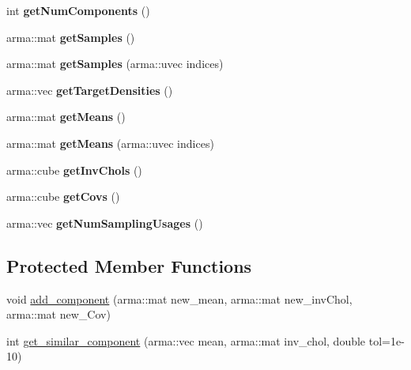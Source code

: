 \begin{DoxyCompactItemize}
\item 
int {\bfseries get\+Num\+Components} ()\hypertarget{classSampleDatabase_ac60d156aee4f7c99a05db259b2a7247f}{}\label{classSampleDatabase_ac60d156aee4f7c99a05db259b2a7247f}

\item 
arma\+::mat {\bfseries get\+Samples} ()\hypertarget{classSampleDatabase_a4aabc7d8ad5d3907b5eda51bc6612a4a}{}\label{classSampleDatabase_a4aabc7d8ad5d3907b5eda51bc6612a4a}

\item 
arma\+::mat {\bfseries get\+Samples} (arma\+::uvec indices)\hypertarget{classSampleDatabase_ab3e52f865350a6d88b16b089b61c3dd9}{}\label{classSampleDatabase_ab3e52f865350a6d88b16b089b61c3dd9}

\item 
arma\+::vec {\bfseries get\+Target\+Densities} ()\hypertarget{classSampleDatabase_a17fe9d9d904446ed71b717166ab452f3}{}\label{classSampleDatabase_a17fe9d9d904446ed71b717166ab452f3}

\item 
arma\+::mat {\bfseries get\+Means} ()\hypertarget{classSampleDatabase_a1a530510578faadad19e0e6e1c05b327}{}\label{classSampleDatabase_a1a530510578faadad19e0e6e1c05b327}

\item 
arma\+::mat {\bfseries get\+Means} (arma\+::uvec indices)\hypertarget{classSampleDatabase_a5cddca18d77ebe760a7fa1a7cee7b75a}{}\label{classSampleDatabase_a5cddca18d77ebe760a7fa1a7cee7b75a}

\item 
arma\+::cube {\bfseries get\+Inv\+Chols} ()\hypertarget{classSampleDatabase_ac33d23bf20bc1bb9b073f2189da233cd}{}\label{classSampleDatabase_ac33d23bf20bc1bb9b073f2189da233cd}

\item 
arma\+::cube {\bfseries get\+Covs} ()\hypertarget{classSampleDatabase_a0728ae1d8dc7fad5d5f0c664478552ae}{}\label{classSampleDatabase_a0728ae1d8dc7fad5d5f0c664478552ae}

\item 
arma\+::vec {\bfseries get\+Num\+Sampling\+Usages} ()\hypertarget{classSampleDatabase_abc5cb375e4a7592cd2ceab8550e6936e}{}\label{classSampleDatabase_abc5cb375e4a7592cd2ceab8550e6936e}

\end{DoxyCompactItemize}
\subsection*{Protected Member Functions}
\begin{DoxyCompactItemize}
\item 
void \hyperlink{classSampleDatabase_adc5a73cc01e5d63513eea7f8d7f5565d}{add\+\_\+component} (arma\+::mat new\+\_\+mean, arma\+::mat new\+\_\+inv\+Chol, arma\+::mat new\+\_\+\+Cov)
\item 
int \hyperlink{classSampleDatabase_a4c4704c5cbe83fa5647f36b36528f49f}{get\+\_\+similar\+\_\+component} (arma\+::vec mean, arma\+::mat inv\+\_\+chol, double tol=1e-\/10)
\end{DoxyCompactItemize}
